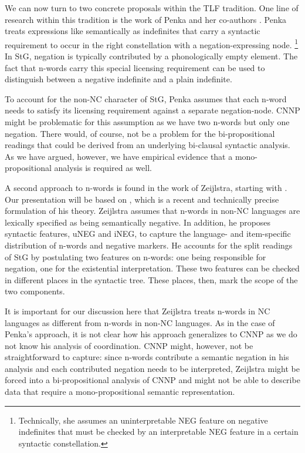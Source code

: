 \documentclass[output=paper]{langsci/langscibook}
\begin{document}
We can now turn to two concrete proposals within the TLF tradition.
One line of research within this tradition is the work of Penka and her co-authors \citep{Penka:Stechow:01,Penka:Zeijlstra:11,Penka:11,Penka:12}.
Penka treats expressions like  semantically as indefinites that carry a syntactic requirement to occur in the right constellation with
a negation-expressing node.%
\footnote{Technically, she assumes an uninterpretable NEG feature on negative indefinites that must be checked by an interpretable NEG feature in a certain syntactic constellation.} 
In StG, 
negation is typically contributed by a phonologically empty element.
The fact that n-words carry this special licensing requirement  can be used to distinguish between a negative indefinite and a plain indefinite. 

\begin{sloppypar}
  To account for the non-NC character of StG, Penka assumes that each
  n-word needs to satisfy its licensing requirement
  against a separate negation-node.  CNNP might be problematic for
  this assumption as we have two n-words but only one negation.  There
  would, of course, not be a problem for the bi-propositional readings
  that could be derived from an underlying bi-clausal syntactic
  analysis.  As we have argued, however, we have empirical evidence
  that a mono-propositional analysis is required as well.
\end{sloppypar}

A second approach to n-words is found in the work of Zeijlstra, starting with \citet{Zeijlstra:04}. 
Our presentation will be based on \citet{Zeijlstra:15}, which is a recent and technically precise formulation of his theory.
Zeijlstra assumes that n-words in non-NC languages are lexically specified as being semantically negative. In addition, he proposes syntactic features, uNEG and iNEG, to capture the language- and item-specific distribution of n-words and negative markers. 
He accounts for the split readings of StG by postulating
two features on n-words: one being responsible for negation, one for the existential interpretation. These two features can be checked in different places in the syntactic tree. These places, then, mark the scope of the two components.

It is important for our discussion here that Zeijlstra treats n-words in NC languages as different from n-words in non-NC languages. 
As in the case of Penka's approach, it is not clear how his approach generalizes to CNNP as we do not know his analysis of coordination. 
CNNP might, however, not be straightforward to capture: since n-words contribute a semantic negation in his analysis and each contributed negation needs to be interpreted, Zeijlstra might be forced into a bi-propositional analysis of CNNP and might not be able to describe data that require a mono-propositional semantic representation.
\end{document}
